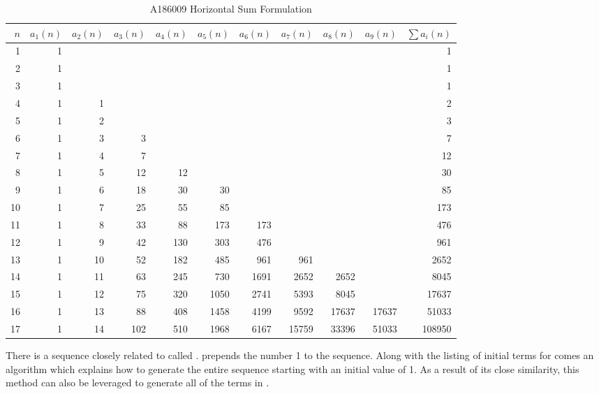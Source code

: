 \documentclass[12pt, oneside]{article}   	%
\numberwithin{equation}{section}          %
\theoremstyle{definition}
\begin{document}
\begin{table}[htbp]
\centering
\caption{A186009 Horizontal Sum Formulation}
\label{tab:A186009}
\vspace{4pt}
\begin{tabular}{@{}rrrrrrrrrrr@{}}
\toprule
$n$ & $a_1(n)$ & $a_2(n)$ & $a_3(n)$ & $a_4(n)$ & $a_5(n)$ &
$a_6(n)$ & $a_7(n)$ & $a_8(n)$ & $a_9(n)$ & $\sum a_i(n)$ \\
\midrule
1  & 1 &   &   &   &   &   &   &   &   & 1 \\
2  & 1 &   &   &   &   &   &   &   &   & 1 \\
3  & 1 &   &   &   &   &   &   &   &   & 1 \\
4  & 1 & 1 &   &   &   &   &   &   &   & 2 \\
5  & 1 & 2 &   &   &   &   &   &   &   & 3 \\
6  & 1 & 3 & 3 &   &   &   &   &   &   & 7 \\
7  & 1 & 4 & 7 &   &   &   &   &   &   & 12 \\
8  & 1 & 5 & 12 & 12 &   &   &   &   &   & 30 \\
9  & 1 & 6 & 18 & 30 & 30 &   &   &   &   & 85 \\
10 & 1 & 7 & 25 & 55 & 85 &   &   &   &   & 173 \\
11 & 1 & 8 & 33 & 88 & 173 & 173 &   &   &   & 476 \\
12 & 1 & 9 & 42 & 130 & 303 & 476 &   &   &   & 961 \\
13 & 1 & 10 & 52 & 182 & 485 & 961 & 961 &   &   & 2652 \\
14 & 1 & 11 & 63 & 245 & 730 & 1691 & 2652 & 2652 &   & 8045 \\
15 & 1 & 12 & 75 & 320 & 1050 & 2741 & 5393 & 8045 &   & 17637 \\
16 & 1 & 13 & 88 & 408 & 1458 & 4199 & 9592 & 17637 & 17637 & 51033 \\
17 & 1 & 14 & 102 & 510 & 1968 & 6167 & 15759 & 33396 & 51033 & 108950 \\
\bottomrule
\end{tabular}
\end{table}

There is a sequence closely related to  called .  
prepends the number 1 to the  sequence.  Along with the listing of initial
terms for  comes an algorithm which explains how to generate the entire sequence
starting with an initial value of 1.  As a result of its close similarity, this method can
also be leveraged to generate all of the terms in . 
\end{document}
